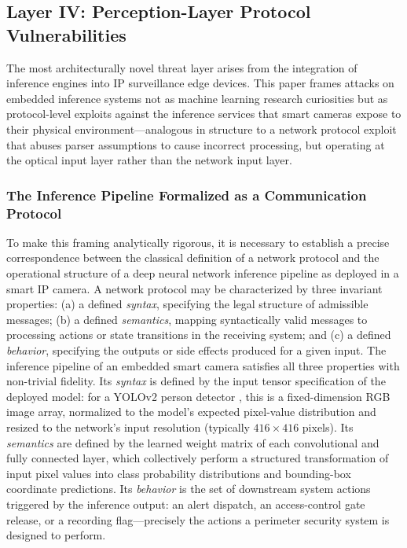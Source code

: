 \documentclass[letterpaper, 10pt, conference]{ieeeconf}
\begin{document}
\subsection{Layer IV: Perception-Layer Protocol Vulnerabilities}
\label{sec:perception}

The most architecturally novel threat layer arises from the integration
of inference engines into IP surveillance edge devices. This paper
frames attacks on embedded inference systems not as machine learning
research curiosities but as protocol-level exploits against the
inference services that smart cameras expose to their physical
environment---analogous in structure to a network protocol exploit
that abuses parser assumptions to cause incorrect processing, but
operating at the optical input layer rather than the network input layer.

\subsubsection*{The Inference Pipeline Formalized as a Communication Protocol}

To make this framing analytically rigorous, it is necessary to
establish a precise correspondence between the classical definition
of a network protocol and the operational structure of a deep neural
network inference pipeline as deployed in a smart IP camera. A network
protocol may be characterized by three invariant properties: (a) a
defined \textit{syntax}, specifying the legal structure of admissible
messages; (b) a defined \textit{semantics}, mapping syntactically valid
messages to processing actions or state transitions in the receiving
system; and (c) a defined \textit{behavior}, specifying the outputs or
side effects produced for a given input. The inference pipeline of an
embedded smart camera satisfies all three properties with non-trivial
fidelity. Its \textit{syntax} is defined by the input tensor
specification of the deployed model: for a YOLOv2 person detector
\cite{thys2019}, this is a fixed-dimension RGB image array, normalized
to the model's expected pixel-value distribution and resized to the
network's input resolution (typically $416 \times 416$ pixels). Its
\textit{semantics} are defined by the learned weight matrix of each
convolutional and fully connected layer, which collectively perform a
structured transformation of input pixel values into class probability
distributions and bounding-box coordinate predictions. Its
\textit{behavior} is the set of downstream system actions triggered
by the inference output: an alert dispatch, an access-control gate
release, or a recording flag---precisely the actions a perimeter
security system is designed to perform.
\end{document}
